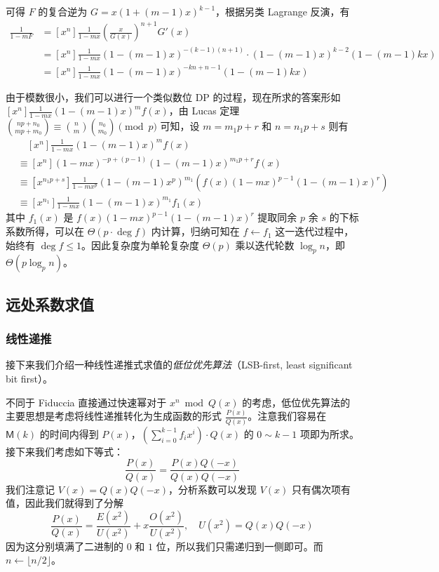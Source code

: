 \begin{solution}
可得 $F$ 的复合逆为 $G=x(1+(m-1)x)^{k-1}$，根据另类 Lagrange 反演，有
\begin{align*}
[x^n] \frac 1{1-mF}
&= [x^n]\frac 1{1-mx}\left(\frac{x}{G(x)}\right)^{n+1}G'(x)\\
&= [x^n]\frac 1{1-mx}(1-(m-1)x)^{-(k-1)(n+1)} \cdot (1-(m-1)x)^{k-2}(1-(m-1)kx)\\
&= [x^n]\frac 1{1-mx}(1-(m-1)x)^{-kn+n-1}(1-(m-1)kx)
\end{align*}

由于模数很小，我们可以进行一个类似数位 DP 的过程，现在所求的答案形如 $[x^n] \frac 1{1-mx}(1-(m-1)x)^mf(x)$，由 Lucas 定理 $\binom {np+n_0}{mp+m_0} \equiv \binom n m\binom{n_0}{m_0} \pmod p$ 可知，设 $m=m_1p+r$ 和 $n=n_1p+s$ 则有
\begin{align*}
&\quad [x^n] \frac 1{1-mx}(1-(m-1)x)^mf(x)\\
&\equiv [x^n] (1-mx)^{-p+(p-1)}(1-(m-1)x)^{m_1p+r} f(x)\\
&\equiv [x^{n_1p+s}] \frac 1{1-mx^p}(1-(m-1)x^p)^{m_1} (f(x)(1-mx)^{p-1}(1-(m-1)x)^r)\\
&\equiv [x^{n_1}] \frac 1{1-mx}(1-(m-1)x)^{m_1} f_1(x)
\end{align*}
其中 $f_1(x)$ 是 $f(x)(1-mx)^{p-1}(1-(m-1)x)^r$ 提取同余 $p$ 余 $s$ 的下标系数所得，可以在 $\Theta(p\cdot \deg f)$ 内计算，归纳可知在 $f\leftarrow f_1$ 这一迭代过程中，始终有 $\deg f \le 1$。因此复杂度为单轮复杂度 $\Theta(p)$ 乘以迭代轮数 $\log_p n$，即 $\Theta(p\log_p n)$。
\end{solution}

\subsection{远处系数求值}

\subsubsection{线性递推}

接下来我们介绍一种线性递推式求值的\emph{低位优先算法}（LSB-first, least significant bit first）。

不同于 Fiduccia 直接通过快速幂对于 $x^n \bmod Q(x)$ 的考虑，低位优先算法的主要思想是考虑将线性递推转化为生成函数的形式 $\frac{P(x)}{Q(x)}$。注意我们容易在 $\mathsf M(k)$ 的时间内得到 $P(x)$，$\left(\sum_{i=0}^{k-1} f_i x^i\right) \cdot Q(x)$ 的 $0\sim k-1$ 项即为所求。接下来我们考虑如下等式：
$$
\frac {P(x)}{Q(x)} = \frac{P(x)Q(-x)}{Q(x)Q(-x)}
$$
我们注意记 $V(x)=Q(x)Q(-x)$，分析系数可以发现 $V(x)$ 只有偶次项有值，因此我们就得到了分解
$$
\frac{P(x)}{Q(x)} = \frac {E(x^2)}{U(x^2)} + x\frac {O(x^2)}{U(x^2)}, \quad U(x^2)=Q(x)Q(-x)
$$
因为这分别填满了二进制的 $0$ 和 $1$ 位，所以我们只需递归到一侧即可。而 $n \leftarrow \lfloor n/2 \rfloor$。

